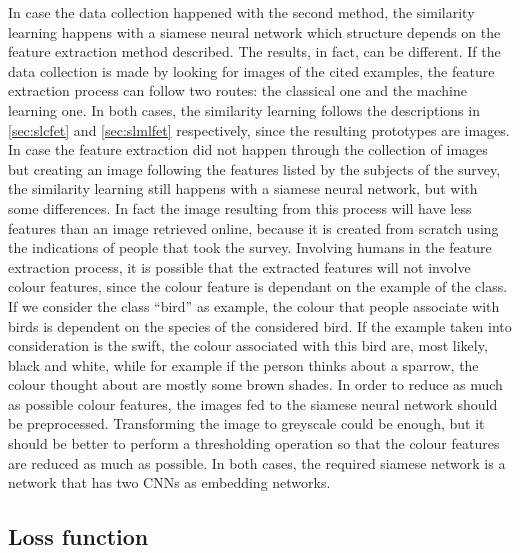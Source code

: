 \documentclass[conference]{IEEEtran}
\begin{document}
			\noindent In case the data collection happened with the second method, the similarity learning happens with a siamese neural network which structure depends on the feature extraction method described. The 
			results, in fact, can be different. If the data collection is made by looking for images of the cited examples, the feature extraction process can follow two routes: the classical one and the machine learning 
			one. In both cases, the similarity learning follows the descriptions in \ref{sec:slcfet} and \ref{sec:slmlfet} respectively, since the resulting prototypes are images. In case the feature extraction did not happen through 
			the collection of images but creating an image following the features listed by the subjects of the survey, the similarity learning still happens with a siamese neural network, but with some differences. In fact 
			the image resulting from this process will have less features than an image retrieved online, because it is created from scratch using the indications of people that took the survey. Involving humans in 
			the feature extraction process, it is possible that the extracted features will not involve colour features, since the colour feature is dependant on the example of the class. If we consider the class ``bird'' as
			example, the colour that people associate with birds is dependent on the species of the considered bird. If the example taken into consideration is the swift, the colour associated with this bird are, most likely, 
			black and white, while for example if the person thinks about a sparrow, the colour thought about are mostly some brown shades. In order to reduce as much as possible colour features, the images fed to 
			the siamese neural network should be preprocessed. Transforming the image to greyscale could be enough, but it should be better to perform a thresholding operation so that the colour features are reduced as much 
			as possible. In both cases, the required siamese network is a network that has two CNNs as embedding networks. 
		
		\subsection{Loss function}
		
\end{document}
